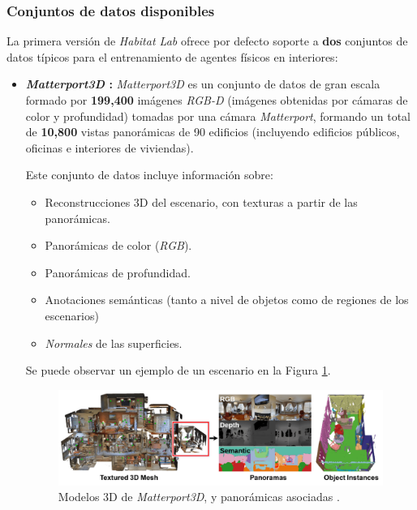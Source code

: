 \subsubsection{Conjuntos de datos disponibles}

La primera versión de \textit{Habitat Lab} ofrece por defecto soporte a \textbf{dos} conjuntos de datos típicos para el entrenamiento de agentes físicos en interiores:

\begin{itemize}
	\item \textbf{\textit{Matterport3D} \cite{Matterport3D}:} \textit{Matterport3D} es un conjunto de datos de gran escala formado por \textbf{199,400} imágenes \textit{RGB-D} (imágenes obtenidas por cámaras de color y profundidad) tomadas por una cámara \textit{Matterport}, formando un total de \textbf{10,800} vistas panorámicas de 90 edificios (incluyendo edificios públicos, oficinas e interiores de viviendas).
	
	Este conjunto de datos incluye información sobre:
	\begin{itemize}
		\item Reconstrucciones 3D del escenario, con texturas a partir de las panorámicas.
		\item Panorámicas de color (\textit{RGB}).
		\item Panorámicas de profundidad.
		\item Anotaciones semánticas (tanto a nivel de objetos como de regiones de los escenarios)
		\item \textit{Normales} de las superficies.
	\end{itemize}
	
	Se puede observar un ejemplo de un escenario en la Figura \ref{fig:chap4-matterport}.
	
	\begin{figure}[h]
    \centering
    \includegraphics[width=\textwidth]{imagenes/cap4/matterport.png}
    \caption{Modelos 3D de \textit{Matterport3D}, y panorámicas asociadas \cite{Matterport3D}.}
    \label{fig:chap4-matterport}
\end{figure}
	

\end{itemize}
